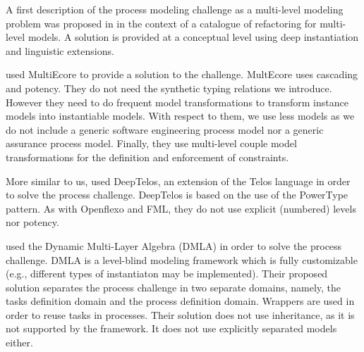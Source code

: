 

A first description of the process modeling challenge as a multi-level modeling problem was proposed in \cite{lara2018refactoring} in the context of a catalogue of refactoring for multi-level models. A solution is provided at a conceptual level using deep instantiation and linguistic extensions.

\cite{multiecore2019} used MultiEcore \citep{multecore2016} to provide a solution to the challenge. MultEcore uses cascading and potency. They do not need the synthetic typing relations we introduce. However they need to do frequent model transformations to transform instance models into instantiable models. With respect to them, we use less models as we do not include a generic software engineering process model nor a generic assurance process model. Finally, they use multi-level couple model transformations for the definition and enforcement of constraints.

More similar to us, \cite{deeptelos2019} used DeepTelos\citep{deeptelos2016}, an extension of the Telos language \citep{telos1990} in order to solve the process challenge. DeepTelos is based on the use of the PowerType \citep{atkinson2001essence} pattern. As with Openflexo and FML, they do not use explicit (numbered) levels nor potency.



\cite{dmla2019} used the Dynamic Multi-Layer Algebra (DMLA)\citep{dmla2017} in order to solve the process challenge. DMLA is a level-blind modeling framework which is fully customizable (e.g., different types of instantiaton may be implemented). Their proposed solution separates the process challenge in two separate domains, namely, the tasks definition domain and the process definition domain. Wrappers are used in order to reuse tasks in processes. Their solution does not use inheritance, as it is not supported by the framework. It does not use explicitly separated models either.


